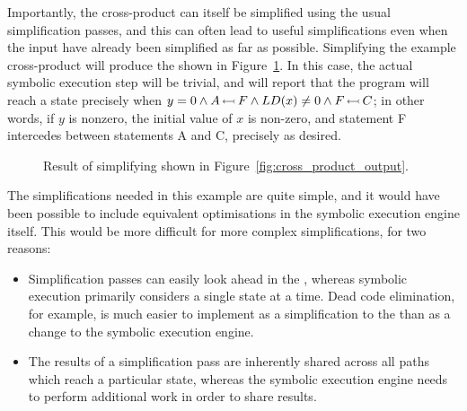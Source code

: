 Importantly, the cross-product {\StateMachine} can itself be
simplified using the usual {\StateMachine} simplification passes, and
this can often lead to useful simplifications even when the input
{\StateMachines} have already been simplified as far as possible.
Simplifying the example cross-product {\StateMachine} will produce the
{\StateMachine} shown in Figure~\ref{fig:cross_product_output_opt}.
In this case, the actual symbolic execution step will be trivial, and
will report that the program will reach a {\stCrash} state precisely
when $y = 0 \wedge A\,{\leftarrowtail}\,F \wedge LD(x) \not= 0 \wedge
F\,{\leftarrowtail}\,C$; in other words, if $y$ is nonzero, the initial
value of $x$ is non-zero, and statement F intercedes between
statements A and C, precisely as desired.

\begin{figure}
  \begin{centering}
  \end{centering}
  \caption{Result of simplifying {\StateMachine} shown in
    Figure~\ref{fig:cross_product_output}.}
  \label{fig:cross_product_output_opt}
\end{figure}

The simplifications needed in this example are quite simple, and it
would have been possible to include equivalent optimisations in the
symbolic execution engine itself.  This would be more difficult for
more complex simplifications, for two reasons:

\begin{itemize}
\item Simplification passes can easily look ahead in the
  {\StateMachine}, whereas symbolic execution primarily considers a
  single state at a time.  Dead code elimination, for example, is much
  easier to implement as a simplification to the {\StateMachine} than
  as a change to the symbolic execution engine.
\item The results of a simplification pass are inherently shared
  across all paths which reach a particular state, whereas the
  symbolic execution engine needs to perform additional work in order
  to share results.
\end{itemize}

